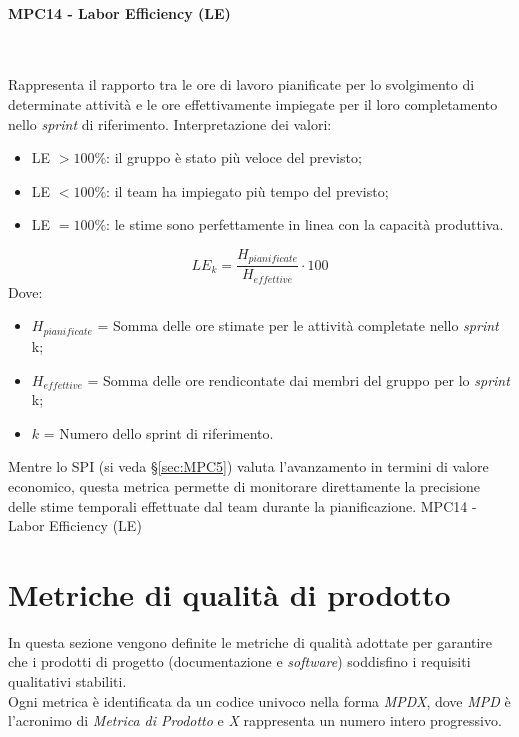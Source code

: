 \documentclass[10pt, letterpaper]{article}
\newcommand{\trisubsection}[1]{\paragraph{#1}\mbox{}\\}
\begin{document}
\trisubsection{MPC14 - Labor Efficiency (LE)}
{Rappresenta il rapporto tra le ore di lavoro pianificate per lo
    svolgimento di determinate attività e le ore effettivamente impiegate
    per il loro completamento nello \textit{sprint} di riferimento.
    Interpretazione dei valori:
    \begin{itemize}
        \item LE $> 100\%$: il gruppo è stato più veloce del previsto;
        \item LE $< 100\%$: il team ha impiegato più tempo del previsto;
        \item LE $= 100\%$: le stime sono perfettamente in linea con la capacità produttiva.
    \end{itemize}
}
{\[ LE_k = \frac{H_{pianificate}}{H_{effettive}} \cdot 100 \]
    Dove:
    \begin{itemize}
        \item $H_{pianificate}$ = Somma delle ore stimate per le attività
              completate nello \textit{sprint} k;
        \item $H_{effettive}$ = Somma delle ore rendicontate dai membri
              del gruppo per lo \textit{sprint} k;
        \item $k$ = Numero dello sprint di riferimento.
    \end{itemize}
}
{Mentre lo SPI (si veda §\ref{sec:MPC5}) valuta l'avanzamento in termini di valore economico,
    questa metrica permette di monitorare direttamente la precisione delle
    stime temporali effettuate dal team durante la pianificazione.}
{MPC14 - Labor Efficiency (LE)}

\section{Metriche di qualità di prodotto}
\label{sec:MetricheProdotto}
In questa sezione vengono definite le metriche di qualità adottate per
garantire che i prodotti di progetto (documentazione e \textit{software})
soddisfino i requisiti qualitativi stabiliti.
\\Ogni metrica è identificata da un codice univoco nella forma \textit{MPDX}, dove \textit{MPD} è l'acronimo di \textit{Metrica di Prodotto} e \textit{X} rappresenta
un numero intero progressivo.
\end{document}
